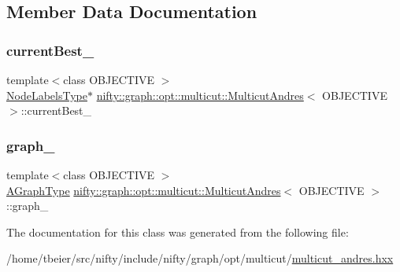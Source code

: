 \subsection{Member Data Documentation}
\mbox{\label{classnifty_1_1graph_1_1opt_1_1multicut_1_1MulticutAndres_adaecc32ca442b03bf2a2f31ba7e14005}} 
\subsubsection{\texorpdfstring{current\+Best\+\_\+}{currentBest\_}}
{\footnotesize\ttfamily template$<$class O\+B\+J\+E\+C\+T\+I\+VE $>$ \\
\hyperlink{classnifty_1_1graph_1_1opt_1_1multicut_1_1MulticutAndres_a6cd9d64abc4a98aa9745ce1ef0d4ecfe}{Node\+Labels\+Type}$\ast$ \hyperlink{classnifty_1_1graph_1_1opt_1_1multicut_1_1MulticutAndres}{nifty\+::graph\+::opt\+::multicut\+::\+Multicut\+Andres}$<$ O\+B\+J\+E\+C\+T\+I\+VE $>$\+::current\+Best\+\_\+\hspace{0.3cm}{\ttfamily [protected]}}

\mbox{\label{classnifty_1_1graph_1_1opt_1_1multicut_1_1MulticutAndres_a49623d993a1fdb16d8d0ba35f974c35a}} 
\subsubsection{\texorpdfstring{graph\+\_\+}{graph\_}}
{\footnotesize\ttfamily template$<$class O\+B\+J\+E\+C\+T\+I\+VE $>$ \\
\hyperlink{classnifty_1_1graph_1_1opt_1_1multicut_1_1MulticutAndres_a0d2a06934455d278149370b1dbcb3953}{A\+Graph\+Type} \hyperlink{classnifty_1_1graph_1_1opt_1_1multicut_1_1MulticutAndres}{nifty\+::graph\+::opt\+::multicut\+::\+Multicut\+Andres}$<$ O\+B\+J\+E\+C\+T\+I\+VE $>$\+::graph\+\_\+\hspace{0.3cm}{\ttfamily [protected]}}



The documentation for this class was generated from the following file\+:\begin{DoxyCompactItemize}
\item 
/home/tbeier/src/nifty/include/nifty/graph/opt/multicut/\hyperlink{multicut__andres_8hxx}{multicut\+\_\+andres.\+hxx}\end{DoxyCompactItemize}
